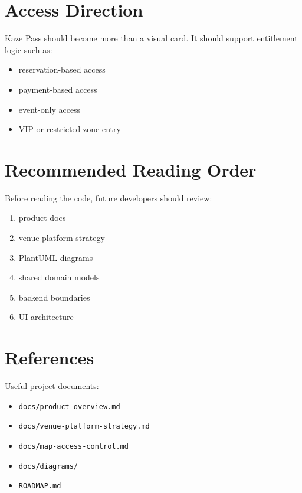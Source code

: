 \documentclass[11pt,a4paper]{article}
\begin{document}
\section{Access Direction}

Kaze Pass should become more than a visual card. It should support entitlement logic such as:
\begin{itemize}
    \item reservation-based access
    \item payment-based access
    \item event-only access
    \item VIP or restricted zone entry
\end{itemize}

\section{Recommended Reading Order}

Before reading the code, future developers should review:
\begin{enumerate}
    \item product docs
    \item venue platform strategy
    \item PlantUML diagrams
    \item shared domain models
    \item backend boundaries
    \item UI architecture
\end{enumerate}

\section{References}

Useful project documents:
\begin{itemize}
    \item \texttt{docs/product-overview.md}
    \item \texttt{docs/venue-platform-strategy.md}
    \item \texttt{docs/map-access-control.md}
    \item \texttt{docs/diagrams/}
    \item \texttt{ROADMAP.md}
\end{itemize}
\end{document}
